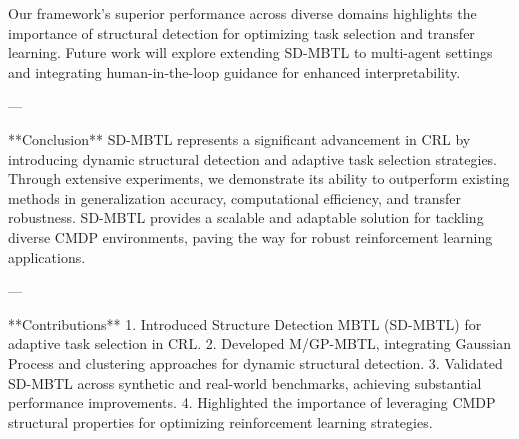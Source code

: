Our framework's superior performance across diverse domains highlights the importance of structural detection for optimizing task selection and transfer learning. Future work will explore extending SD-MBTL to multi-agent settings and integrating human-in-the-loop guidance for enhanced interpretability.

---

**Conclusion**  
SD-MBTL represents a significant advancement in CRL by introducing dynamic structural detection and adaptive task selection strategies. Through extensive experiments, we demonstrate its ability to outperform existing methods in generalization accuracy, computational efficiency, and transfer robustness. SD-MBTL provides a scalable and adaptable solution for tackling diverse CMDP environments, paving the way for robust reinforcement learning applications.

---

**Contributions**  
1. Introduced Structure Detection MBTL (SD-MBTL) for adaptive task selection in CRL.  
2. Developed M/GP-MBTL, integrating Gaussian Process and clustering approaches for dynamic structural detection.  
3. Validated SD-MBTL across synthetic and real-world benchmarks, achieving substantial performance improvements.  
4. Highlighted the importance of leveraging CMDP structural properties for optimizing reinforcement learning strategies.  